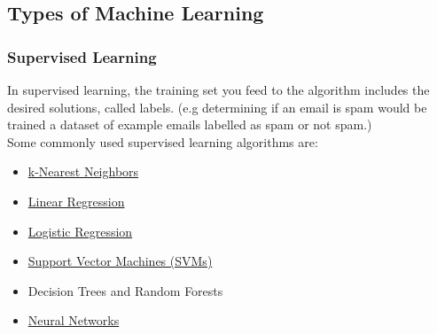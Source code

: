 \documentclass[12pt]{article}
\begin{document}
    \subsection{Types of Machine Learning}
        \subsubsection{Supervised Learning}
            In supervised learning, the training set you feed to the algorithm includes the desired solutions, called
            labels. (e.g determining if an email is spam would be trained a dataset of example emails labelled as spam or
            not spam.) \\[0.1in] 
            Some commonly used supervised learning algorithms are:
            \begin{itemize}
                \item \hyperref[sec:KNN]{k-Nearest Neighbors}
                \item \hyperref[sec:LinearRegression]{Linear Regression}
                \item \hyperref[sec:LogisticRegression]{Logistic Regression}
                \item \hyperref[sec:SVM]{Support Vector Machines (SVMs)}
                \item Decision Trees and Random Forests
                \item \hyperref[sec:ANN]{Neural Networks}
            \end{itemize}
        
\end{document}
